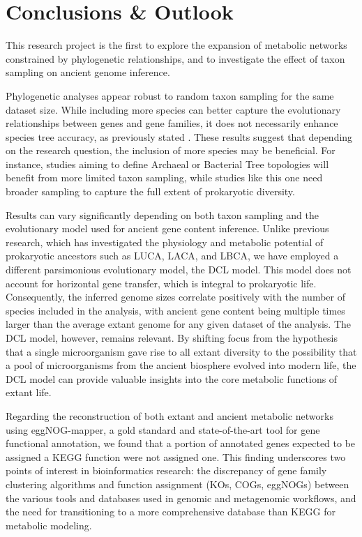 \section{Conclusions \& Outlook}
\normalsize

This research project is the first to explore the expansion of metabolic networks constrained by phylogenetic relationships, and to investigate the effect of taxon sampling on ancient genome inference. 

Phylogenetic analyses appear robust to random taxon sampling for the same dataset size. While including more species can better capture the evolutionary relationships between genes and gene families, it does not necessarily enhance species tree accuracy, as previously stated \cite{martinez-gutierrez2021}. These results suggest that depending on the research question, the inclusion of more species may be beneficial. For instance, studies aiming to define Archaeal or Bacterial Tree topologies will benefit from more limited taxon sampling, while studies like this one need broader sampling to capture the full extent of prokaryotic diversity. 

Results can vary significantly depending on both taxon sampling and the evolutionary model used for ancient gene content inference. Unlike previous research, which has investigated the physiology and metabolic potential of prokaryotic ancestors such as LUCA, LACA, and LBCA, we have employed a different parsimonious evolutionary model, the DCL model. This model does not account for horizontal gene transfer, which is integral to prokaryotic life. Consequently, the inferred genome sizes correlate positively with the number of species included in the analysis, with ancient gene content being multiple times larger than the average extant genome for any given dataset of the analysis. The DCL model, however, remains relevant. By shifting focus from the hypothesis that a single microorganism gave rise to all extant diversity to the possibility that a pool of microorganisms from the ancient biosphere evolved into modern life, the DCL model can provide valuable insights into the core metabolic functions of extant life.

Regarding the reconstruction of both extant and ancient metabolic networks using eggNOG-mapper, a gold standard and state-of-the-art tool for gene functional annotation, we found that a portion of annotated genes expected to be assigned a KEGG function were not assigned one. This finding underscores two points of interest in bioinformatics research: the discrepancy of gene family clustering algorithms and function assignment (KOs, COGs, eggNOGs) between the various tools and databases used in genomic and metagenomic workflows, and the need for transitioning to a more comprehensive database than KEGG for metabolic modeling. 

